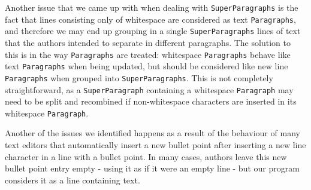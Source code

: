       Another issue that we came up with when dealing with \texttt{SuperParagraphs} is the fact that lines consisting only of whitespace are considered as text \texttt{Paragraphs}, and therefore we may end up grouping in a single \texttt{SuperParagraphs} lines of text that the authors intended to separate in different paragraphs. The solution to this is in the way \texttt{Paragraphs} are treated: whitespace \texttt{Paragraphs} behave like text \texttt{Paragraphs} when being updated, but should be considered like new line \texttt{Paragraphs} when grouped into \texttt{SuperParagraphs}. This is not completely straightforward, as a \texttt{SuperParagraph} containing a whitespace \texttt{Paragraph} may need to be split and recombined if non-whitespace characters are inserted in its whitespace \texttt{Paragraph}.
      
      Another of the issues we identified happens as a result of the behaviour of many text editors that automatically insert a new bullet point after inserting a new line character in a line with a bullet point. In many cases, authors leave this new bullet point entry empty - using it as if it were an empty line - but our program considers it as a line containing text.